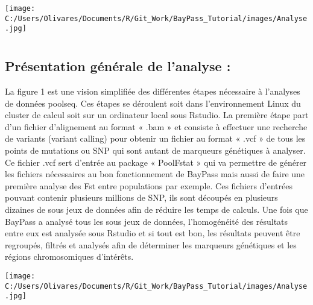 \documentclass[
  openany]{book}
\begin{document}
\texttt{[image: C:/Users/Olivares/Documents/R/Git\_Work/BayPass\_Tutorial/images/Analyse.jpg]}

\hypertarget{section}{%
\chapter*{}\label{section}}

\hypertarget{pruxe9sentation-guxe9nuxe9rale-de-lanalyse-1}{%
\section*{Présentation générale de l'analyse :}\label{pruxe9sentation-guxe9nuxe9rale-de-lanalyse-1}}

La figure 1 est une vision simplifiée des différentes étapes nécessaire à l'analyses de données poolseq. Ces étapes se déroulent soit dans l'environnement Linux du cluster de calcul soit sur un ordinateur local sous Rstudio.
La première étape part d'un fichier d'alignement au format « .bam » et consiste à effectuer une recherche de variants (variant calling) pour obtenir un fichier au format « .vcf » de tous les points de mutations ou SNP qui sont autant de marqueurs génétiques à analyser. Ce fichier .vcf sert d'entrée au package « PoolFstat » qui va permettre de générer les fichiers nécessaires au bon fonctionnement de BayPass mais aussi de faire une première analyse des Fst entre populations par exemple. Ces fichiers d'entrées pouvant contenir plusieurs millions de SNP, ils sont découpés en plusieurs dizaines de sous jeux de données afin de réduire les temps de calculs. Une fois que BayPass a analysé tous les sous jeux de données, l'homogénéité des résultats entre eux est analysée sous Rstudio et si tout est bon, les résultats peuvent être regroupés, filtrés et analysés afin de déterminer les marqueurs génétiques et les régions chromosomiques d'intérêts.

\texttt{[image: C:/Users/Olivares/Documents/R/Git\_Work/BayPass\_Tutorial/images/Analyse.jpg]}

  
\end{document}

